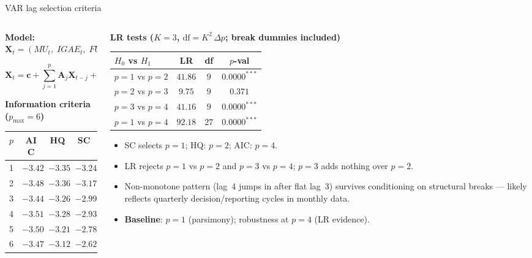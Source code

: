 \begin{frame}{VAR lag selection criteria}

\begin{columns}[T]

\begin{column}{0.48\textwidth}

\textbf{Model:} $\mathbf{X}_t = (MU_t,\; IGAE_t,\; FU_t)'$

\vspace{1mm}
\[
\mathbf{X}_t = \mathbf{c} + \sum_{j=1}^{p} \mathbf{A}_j \mathbf{X}_{t-j} + \mathbf{u}_t
\]

\vspace{2mm}
\small\textbf{Information criteria ($p_{\max} = 6$)}

\vspace{1mm}
\begin{tabular}{cccc}
\hline
$p$ & AIC & HQ & SC \\
\hline
1 & $-3.42$ & $-3.35$ & $\mathbf{-3.24}$ \\
2 & $-3.48$ & $\mathbf{-3.36}$ & $-3.17$ \\
3 & $-3.44$ & $-3.26$ & $-2.99$ \\
4 & $\mathbf{-3.51}$ & $-3.28$ & $-2.93$ \\
5 & $-3.50$ & $-3.21$ & $-2.78$ \\
6 & $-3.47$ & $-3.12$ & $-2.62$ \\
\hline
\end{tabular}

\end{column}

\begin{column}{0.49\textwidth}

\small\textbf{LR tests ($K=3$, $\mathrm{df}=K^2\,\Delta p$; break dummies included)}

\vspace{1mm}
\begin{tabular}{lccc}
\hline
$H_0$ vs $H_1$ & LR & df & $p$-val \\
\hline
$p=1$ vs $p=2$ & $41.86$ & $9$ & $0.0000^{***}$ \\
$p=2$ vs $p=3$ & $9.75$  & $9$ & $0.371$ \\
$p=3$ vs $p=4$ & $41.16$ & $9$ & $0.0000^{***}$ \\
$p=1$ vs $p=4$ & $92.18$ & $27$ & $0.0000^{***}$ \\
\hline
\end{tabular}

\vspace{3mm}
\begin{itemize}\small
  \item SC selects $p=1$; HQ: $p=2$; AIC: $p=4$.
  \item LR rejects $p=1$ vs $p=2$ and $p=3$ vs $p=4$; $p=3$ adds nothing over $p=2$.
  \item Non-monotone pattern (lag~4 jumps in after flat lag~3) survives conditioning on structural breaks — likely reflects quarterly decision/reporting cycles in monthly data.
  \item \textbf{Baseline}: $p=1$ (parsimony); robustness at $p=4$ (LR evidence).
\end{itemize}


\end{column}
\end{columns}
\end{frame}
